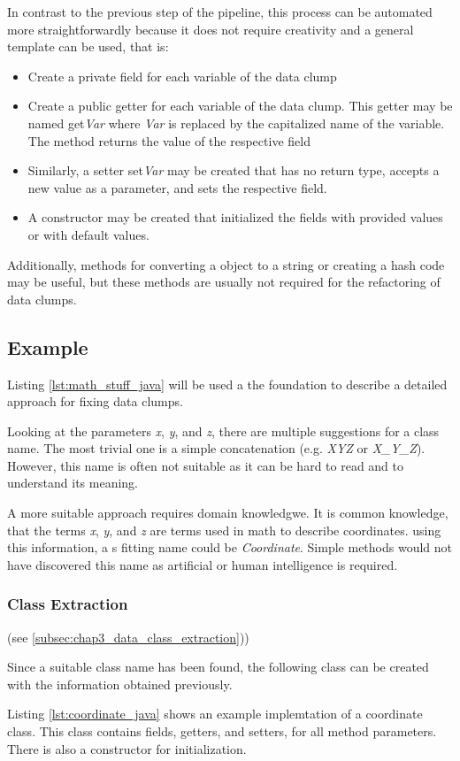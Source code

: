 In contrast to the previous step of the pipeline, this process can be automated more straightforwardly because it does not require creativity and a general template can be used, that is:
\begin{itemize}
    \item Create a private field for each variable of the data clump
    \item Create a public getter for each variable of the data clump. This getter may be named get\textit{Var} where \textit{Var} is replaced by the capitalized name of the variable. The method returns the value of the respective field
    \item Similarly, a setter set\textit{Var} may be created that has no return type, accepts a new value as a parameter, and sets the respective field. 
    \item A constructor may be created that initialized the fields with provided values or with default values. 
\end{itemize}

Additionally, methods for converting a object to a string or creating a hash code may be useful, but these methods are usually not required for the refactoring of data clumps. 

\subsection{Example}
Listing \ref{lst:math_stuff_java} will be used a the foundation to describe a detailed approach for fixing data clumps.

Looking at the parameters \textit{x}, \textit{y}, and \textit{z}, there are multiple suggestions for a class name. The most trivial one is a simple concatenation  (e.g. \textit{XYZ} or \textit{X\_Y\_Z}). However, this name is often not suitable as it can be hard to read and to understand its meaning.

A more suitable approach requires domain knowledgwe. It is common knowledge, that the terms \textit{x}, \textit{y}, and \textit{z} are terms used in math to describe coordinates. using this information, a s fitting name could be \textit{Coordinate}. Simple methods would not have discovered this name as artificial or human intelligence is required. 

\subsubsection{Class Extraction} (see \ref{subsec:chap3_data_class_extraction}))

Since a suitable class name has been found, the following class can be created with the information obtained previously. 

Listing \ref{lst:coordinate_java} shows an example implemtation of a coordinate class. This class contains fields, getters, and setters, for all method parameters. There is also a constructor for initialization.  




\hfill
